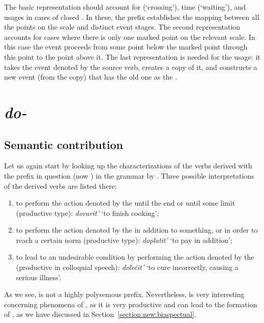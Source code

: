 The basic representation should account for  (`crossing'), time (`waiting'), and  usages in cases of closed . In these, the prefix establishes the mapping between all the points on the scale and distinct event stages. The second representation accounts for cases where there is only one marked point on the relevant scale. In this case the event proceeds from some point below the marked point through this point to the point above it. The last representation is needed for the  usage: it takes the event denoted by the source verb, creates a copy of it, and constructs a new event (from the copy) that has the old one as the .

\section{\textit{do-}}\label{subsection:semantics:do}
\subsection{Semantic contribution}
Let us again start by looking up the characterizations of the verbs derived with the prefix in question (now ) in the grammar by \citet[357--358]{Shvedova:82}. Three possible interpretations of the derived verbs are listed there:
\begin{enumerate}
\item to perform the action denoted by the  until the end or until some limit (productive type): \textit{dovarit'} `to finish cooking';
\item to perform the action denoted by the  in addition to something, or in order to reach a certain norm (productive type): \textit{doplatit'} `to pay in addition';
\item to lead to an undesirable condition by performing the action denoted by the  (productive in colloquial speech): \textit{dole\v{c}it'} `to cure incorrectly, causing a serious illness'.
\end{enumerate}

As we see,  is not a highly polysemous prefix. Nevertheless,  is very interesting concerning phenomena of , as it is very productive and can lead to the formation of , as we have discussed in Section~\ref{section:new:biaspectual}. 


